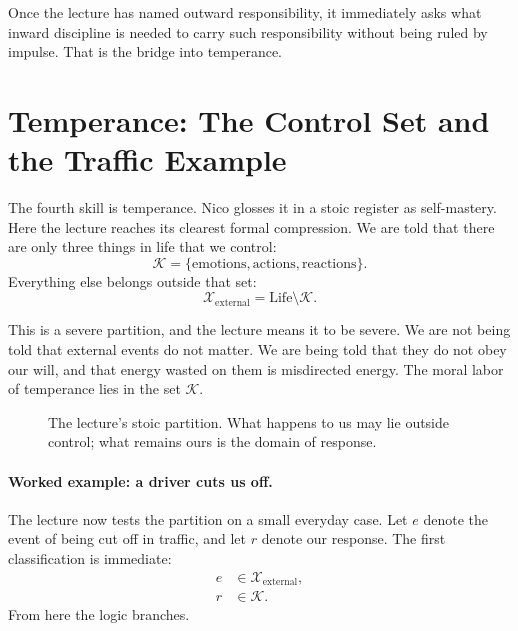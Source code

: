 Once the lecture has named outward responsibility, it immediately asks what inward discipline is needed to carry such responsibility without being ruled by impulse. That is the bridge into temperance.

\section{Temperance: The Control Set and the Traffic Example}

The fourth skill is temperance. Nico glosses it in a stoic register as self-mastery. Here the lecture reaches its clearest formal compression. We are told that there are only three things in life that we control:
\begin{equation}
\mathcal{K}=\{\mathrm{emotions},\mathrm{actions},\mathrm{reactions}\}.
\end{equation}
Everything else belongs outside that set:
\begin{equation}
\mathcal{X}_{\mathrm{external}}=\mathrm{Life}\setminus \mathcal{K}.
\end{equation}

This is a severe partition, and the lecture means it to be severe. We are not being told that external events do not matter. We are being told that they do not obey our will, and that energy wasted on them is misdirected energy. The moral labor of temperance lies in the set \(\mathcal{K}\).

\begin{figure}[h]
\centering
{}
\caption{The lecture's stoic partition. What happens to us may lie outside control; what remains ours is the domain of response.}
\end{figure}

\paragraph{Worked example: a driver cuts us off.}
The lecture now tests the partition on a small everyday case. Let \(e\) denote the event of being cut off in traffic, and let \(r\) denote our response. The first classification is immediate:
\begin{align}
e &\in \mathcal{X}_{\mathrm{external}},\\
r &\in \mathcal{K}.
\end{align}
From here the logic branches.

